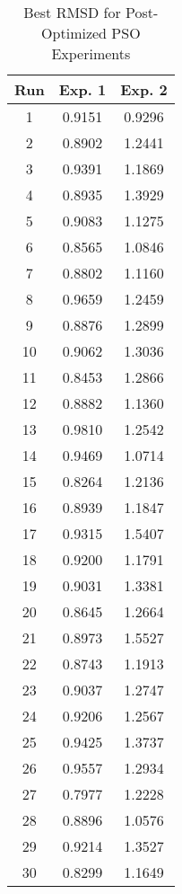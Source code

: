 \begin{table}
	\centering
	\begin{tabular}{ | c | c | c | }
		\hline
		Run & Exp. 1 & Exp. 2 \\ \hline
		1 & 0.9151 & 0.9296 \\ \hline
		2 & 0.8902 & 1.2441 \\ \hline
		3 & 0.9391 & 1.1869 \\ \hline
		4 & 0.8935 & 1.3929 \\ \hline
		5 & 0.9083 & 1.1275 \\ \hline
		6 & 0.8565 & 1.0846 \\ \hline
		7 & 0.8802 & 1.1160 \\ \hline
		8 & 0.9659 & 1.2459 \\ \hline
		9 & 0.8876 & 1.2899 \\ \hline
		10 & 0.9062 & 1.3036 \\ \hline
		11 & 0.8453 & 1.2866 \\ \hline
		12 & 0.8882 & 1.1360 \\ \hline
		13 & 0.9810 & 1.2542 \\ \hline
		14 & 0.9469 & 1.0714 \\ \hline
		15 & 0.8264 & 1.2136 \\ \hline
		16 & 0.8939 & 1.1847 \\ \hline
		17 & 0.9315 & 1.5407 \\ \hline
		18 & 0.9200 & 1.1791 \\ \hline
		19 & 0.9031 & 1.3381 \\ \hline
		20 & 0.8645 & 1.2664 \\ \hline
		21 & 0.8973 & 1.5527 \\ \hline
		22 & 0.8743 & 1.1913 \\ \hline
		23 & 0.9037 & 1.2747 \\ \hline
		24 & 0.9206 & 1.2567 \\ \hline
		25 & 0.9425 & 1.3737 \\ \hline
		26 & 0.9557 & 1.2934 \\ \hline
		27 & 0.7977 & 1.2228 \\ \hline
		28 & 0.8896 & 1.0576 \\ \hline
		29 & 0.9214 & 1.3527 \\ \hline
		30 & 0.8299 & 1.1649 \\ \hline
	\end{tabular}
	\caption{Best RMSD for Post-Optimized PSO Experiments}
	\label{table:appendix-post-pso}
\end{table}

